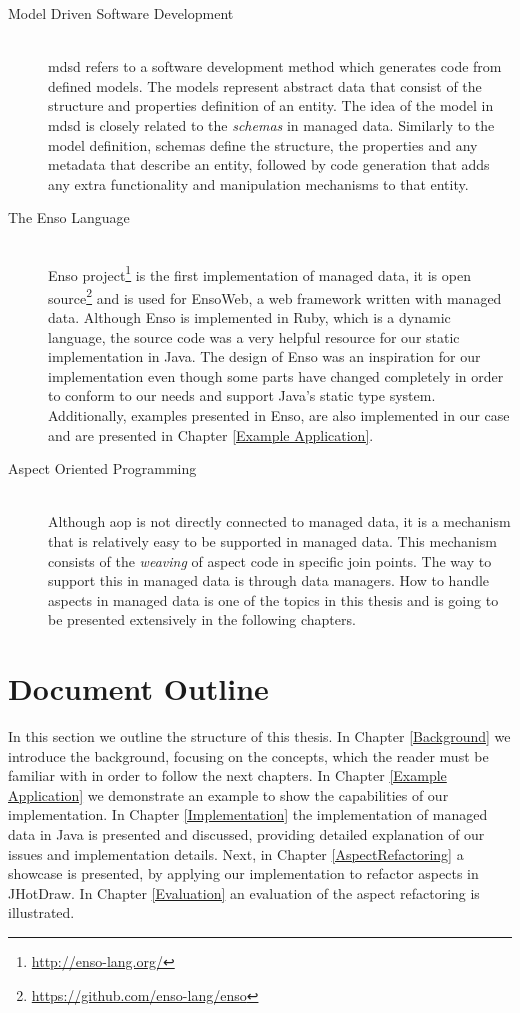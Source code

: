 \begin{description}
  \item[Model Driven Software Development]~\\
  \ac{mdsd} refers to a software development method which generates code from defined models. 
  The models represent abstract data that consist of the structure and properties definition of an entity.
  The idea of the model in \ac{mdsd} is closely related to the \textit{schemas} in managed data.
  Similarly to the model definition, schemas define the structure, the properties and any metadata that describe an entity, followed by code generation that adds any extra functionality and manipulation mechanisms to that entity.

  \item[The Enso Language]~\\
  Enso project\footnote{\url{http://enso-lang.org/}} is the first implementation of managed data, 
  it is open source\footnote{\url{https://github.com/enso-lang/enso}} and is used for EnsoWeb, a web framework written with managed data.
  Although Enso is implemented in Ruby, which is a dynamic language, the source code was a very helpful resource for our static implementation in Java. 
  The design of Enso was an inspiration for our implementation even though some parts have changed completely in order to conform to our needs and support Java's static type system.
  Additionally, examples presented in Enso, are also implemented in our case and are presented in Chapter \ref{Example Application}.

  \item[Aspect Oriented Programming]~\\
  Although \ac{aop} is not directly connected to managed data, it is a mechanism that is relatively easy to be supported in managed data.
  This mechanism consists of the \textit{weaving} of aspect code in specific join points. 
  The way to support this in managed data is through data managers. 
  How to handle aspects in managed data is one of the topics in this thesis and is going to be presented extensively in the following chapters.

\end{description}

\section{Document Outline}\label{Document Outline}
In this section we outline the structure of this thesis. 
In Chapter \ref{Background} we introduce the background, focusing on the concepts, which the reader must be familiar with in order to follow the next chapters.
In Chapter \ref{Example Application} we demonstrate an example to show the capabilities of our implementation.
In Chapter \ref{Implementation} the implementation of managed data in Java is presented and discussed, providing detailed explanation of our issues and implementation details.
Next, in Chapter \ref{AspectRefactoring} a showcase is presented, by applying our implementation to refactor aspects in JHotDraw.
In Chapter \ref{Evaluation} an evaluation of the aspect refactoring is illustrated.


